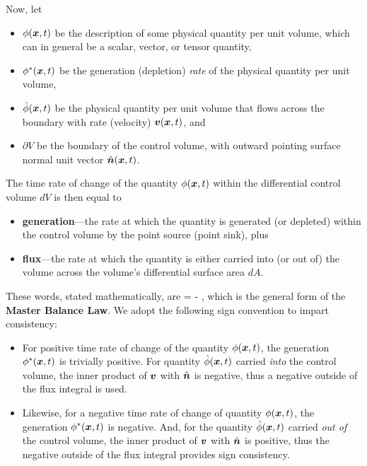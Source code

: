 Now, let 
\begin{itemize}
\item $\phi(\mbox{\boldmath $x$}, t)$ be the description of some physical quantity 
per unit volume, which can in general be a scalar, vector, or tensor quantity, 

\item $\phi^*(\mbox{\boldmath $x$}, t)$ be the generation (depletion) {\em rate} of the 
physical quantity per unit volume, 

\item $\hat{\phi}(\mbox{\boldmath $x$}, t)$ be the physical quantity per unit volume 
that flows across the boundary with rate (velocity) $\mbox{\boldmath $v$}(\mbox{\boldmath $x$}, t)$, and 

\item $\partial V$ be the boundary of the control volume, 
with outward pointing surface normal unit vector $\hat{\mbox{\boldmath $n$}}(\mbox{\boldmath $x$}, t)$.  
\end{itemize} 
The time rate of change of the quantity $\phi(\mbox{\boldmath $x$},t)$ within the 
differential control volume $dV$ is then equal to 
\begin{itemize}
\item {\bf generation}---the rate at which the quantity is generated (or depleted) 
within the control volume by the point source (point sink), plus
\item {\bf flux}---the rate at which the quantity is either carried into (or out of) 
the volume across the volume's differential surface area $dA$.
\end{itemize}
These words, stated mathematically, are
\be
  \;\; = \;\;  
   \;\; - \;\;
   ,
\ee
which is the general form of the 
{\bf Master Balance Law}.  We adopt the following sign convention 
to impart consistency:
\begin{itemize}
\item For positive time rate of change of the quantity $\phi(\mbox{\boldmath $x$},t)$, 
the generation $\phi^*(\mbox{\boldmath $x$},t)$ is trivially positive.  
For quantity $\hat{\phi}(\mbox{\boldmath $x$},t)$ carried
{\em into} the control volume, the inner product of $\mbox{\boldmath $v$}$ with $\hat{\mbox{\boldmath $n$}}$ is
negative, thus a negative outside of the flux integral is used.  
\item Likewise, for a negative time rate of change of 
quantity $\phi(\mbox{\boldmath $x$},t)$, 
the generation $\phi^*(\mbox{\boldmath $x$},t)$ is negative.  
And, for the quantity $\hat{\phi}(\mbox{\boldmath $x$},t)$ 
carried {\em out of} the control volume, the inner product of $\mbox{\boldmath $v$}$ with
$\hat{\mbox{\boldmath $n$}}$ is positive, thus the negative outside of the flux integral 
provides sign consistency.  
\end{itemize}

